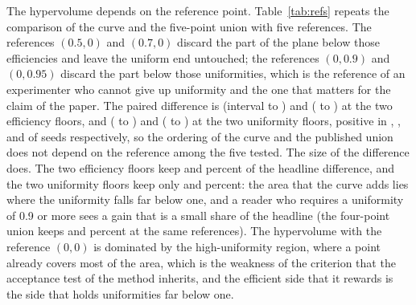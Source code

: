 The hypervolume depends on the reference point. Table~\ref{tab:refs} repeats the comparison of the curve and the five-point union with five references. The references $(0.5,0)$ and $(0.7,0)$ discard the part of the plane below those efficiencies and leave the uniform end untouched; the references $(0,0.9)$ and $(0,0.95)$ discard the part below those uniformities, which is the reference of an experimenter who cannot give up uniformity and the one that matters for the claim of the paper. The paired difference is \hvRefFiveHalfDiff{} (interval \hvRefFiveHalfLo{} to \hvRefFiveHalfHi) and \hvRefFiveSevenDiff{} (\hvRefFiveSevenLo{} to \hvRefFiveSevenHi) at the two efficiency floors, and \hvRefFiveUNineDiff{} (\hvRefFiveUNineLo{} to \hvRefFiveUNineHi) and \hvRefFiveUNineFiveDiff{} (\hvRefFiveUNineFiveLo{} to \hvRefFiveUNineFiveHi) at the two uniformity floors, positive in \hvRefFiveHalfGe{}, \hvRefFiveSevenGe{}, \hvRefFiveUNineGe{} and \hvRefFiveUNineFiveGe{} of \nSeeds{} seeds respectively, so the ordering of the curve and the published union does not depend on the reference among the five tested.
The size of the difference does. The two efficiency floors keep \hvRefFiveHalfShare{} and \hvRefFiveSevenShare{} percent of the headline difference, and the two uniformity floors keep only \hvRefFiveUNineShare{} and \hvRefFiveUNineFiveShare{} percent: the area that the curve adds lies where the uniformity falls far below one, and a reader who requires a uniformity of 0.9 or more sees a gain that is a small share of the headline (the four-point union keeps \hvRefFourUNineShare{} and \hvRefFourUNineFiveShare{} percent at the same references). The hypervolume with the reference $(0,0)$ is dominated by the high-uniformity region, where a point already covers most of the area, which is the weakness of the criterion that the acceptance test of the method inherits, and the efficient side that it rewards is the side that holds uniformities far below one.


\begin{table}[t]
\centering\small
\caption{Hypervolume of the curve and of the headline union of the five published points for five reference points, with the paired difference (mean $\pm$ half-width of the 95 percent interval over \nSeeds{} seeds), the share of the headline difference that each reference keeps (column Kept, in percent), and the paired difference against the four-point union. The ordering is the same for the five references; the uniformity floors keep a small share of the gain.}
\label{tab:refs}

\end{table}

